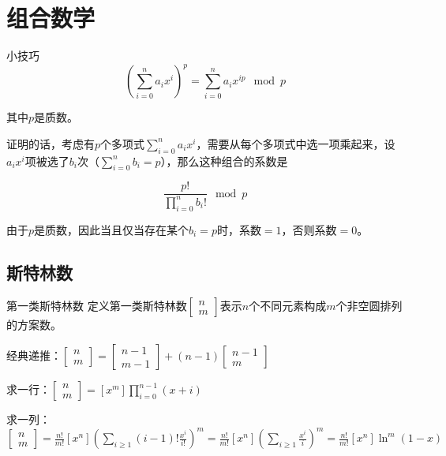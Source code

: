 \documentclass{beamer}
\begin{document}
	\section{组合数学}
	\begin{frame}{小技巧}
		$$(\sum_{i=0}^na_ix^i)^p = \sum_{i=0}^na_ix^{ip} \mod p$$
		
		其中$p$是质数。
		
		证明的话，考虑有$p$个多项式$\sum_{i=0}^na_ix^i$，需要从每个多项式中选一项乘起来，设$a_ix^i$项被选了$b_i$次（$\sum_{i=0}^nb_i=p$），那么这种组合的系数是
		
		$$\frac{p!}{\prod_{i=0}^nb_i!} \mod p$$
		
		由于$p$是质数，因此当且仅当存在某个$b_i=p$时，系数$=1$，否则系数$=0$。
	\end{frame}
	\subsection{斯特林数}
	\begin{frame}{第一类斯特林数}
		定义第一类斯特林数$\begin{bmatrix}n\\m\end{bmatrix}$表示$n$个不同元素构成$m$个非空圆排列的方案数。
		
		经典递推：$\begin{bmatrix}n\\m\end{bmatrix}=\begin{bmatrix}n-1\\m-1\end{bmatrix}+(n-1)\begin{bmatrix}n-1\\m\end{bmatrix}$
		
		求一行：$\begin{bmatrix}n\\m\end{bmatrix}=[x^m]\prod_{i=0}^{n-1}(x+i)$
		
		求一列：$\begin{bmatrix}n\\m\end{bmatrix}=\frac{n!}{m!}[x^n](\sum_{i\ge 1}(i-1)!\frac{x^i}{i!})^m=\frac{n!}{m!}[x^n](\sum_{i\ge 1}\frac{x^i}{i})^m=\frac{n!}{m!}[x^n]\ln^m(1-x)$
	\end{frame}
\end{document}
